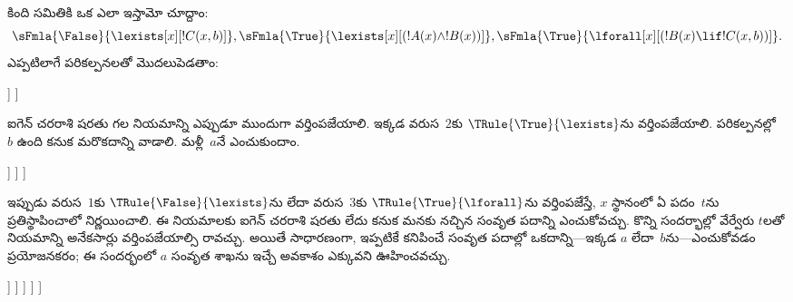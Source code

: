 \documentclass[../../../include/open-logic-section]{subfiles}
\begin{document}
\begin{ex}
కింది సమితికి ఒక  ఎలా ఇస్తామో చూద్దాం:
\[
\sFmla{\False}{\lexists[x][!C(x,b)]},
\sFmla{\True}{\lexists[x][(!A(x) \land !B(x))]},
\sFmla{\True}{\lforall[x][(!B(x) \lif !C(x,b))]}.
\]
ఎప్పటిలాగే పరికల్పనలతో మొదలుపెడతాం:
\begin{oltableau}
  [\sFmla{\False}{\lexists[x][\formula{C}(x,b)]}, just=\TAss
    [\sFmla{\True}{\lexists[x][(\formula{A}(x) \land \formula{B}(x))]},
      just=\TAss
      [\sFmla{\True}{\lforall[x][(\formula{B}(x) \lif \formula{C}(x,b))]},
        just=\TAss]
    ]
  ]
\end{oltableau}
ఐగెన్ చరరాశి షరతు గల నియమాన్ని ఎప్పుడూ ముందుగా
వర్తింపజేయాలి. ఇక్కడ వరుస~$2$కు $\TRule{\True}{\lexists}$ను
వర్తింపజేయాలి. పరికల్పనల్లో ~$b$ ఉంది కనుక మరొకదాన్ని
వాడాలి. మళ్లీ~$a$నే ఎంచుకుందాం.
\begin{oltableau}
  [\sFmla{\False}{\lexists[x][\formula{C}(x,b)]}, just=\TAss
    [\sFmla{\True}{\lexists[x][(\formula{A}(x) \land \formula{B}(x))]},
      just=\TAss, checked
      [\sFmla{\True}{\lforall[x][(\formula{B}(x) \lif \formula{C}(x,b))]},
        just=\TAss
        [\sFmla{\True}{\formula{A}(a) \land \formula{B}(a)},
          just={\TRule{\True}{\lexists}[2]}]
      ]
    ]
  ]
\end{oltableau}
ఇప్పుడు వరుస~$1$కు $\TRule{\False}{\lexists}$ను లేదా వరుస~$3$కు
$\TRule{\True}{\lforall}$ను వర్తింపజేస్తే, $x$ స్థానంలో ఏ పదం~$t$ను
ప్రతిస్థాపించాలో నిర్ణయించాలి. ఈ నియమాలకు ఐగెన్ చరరాశి షరతు లేదు
కనుక మనకు నచ్చిన సంవృత పదాన్ని ఎంచుకోవచ్చు. కొన్ని సందర్భాల్లో వేర్వేరు
$t$లతో నియమాన్ని అనేకసార్లు వర్తింపజేయాల్సి రావచ్చు. అయితే సాధారణంగా,  ఇప్పటికే కనిపించే సంవృత పదాల్లో ఒకదాన్ని---ఇక్కడ
$a$ లేదా~$b$ను---ఎంచుకోవడం ప్రయోజనకరం; ఈ సందర్భంలో $a$ సంవృత శాఖను
ఇచ్చే అవకాశం ఎక్కువని ఊహించవచ్చు.
\begin{oltableau}
  [\sFmla{\False}{\lexists[x][\formula{C}(x,b)]}, just=\TAss
    [\sFmla{\True}{\lexists[x][(\formula{A}(x) \land \formula{B}(x))]},
      just=\TAss, checked
      [\sFmla{\True}{\lforall[x][(\formula{B}(x) \lif \formula{C}(x,b))]}, just=\TAss
        [\sFmla{\True}{\formula{A}(a) \land \formula{B}(a)}, just={\TRule{\True}{\lexists}[2]}
          [\sFmla{\False}{\formula{C}(a,b)}, just={\TRule{\False}{\lexists}[1]}
            [\sFmla{\True}{\formula{B}(a) \lif \formula{C}(a,b)},
              just={\TRule{\True}{\lforall}[3]}
            ]
          ]
        ]
      ]
    ]
  ]
\end{oltableau}

\end{ex}
\end{document}
